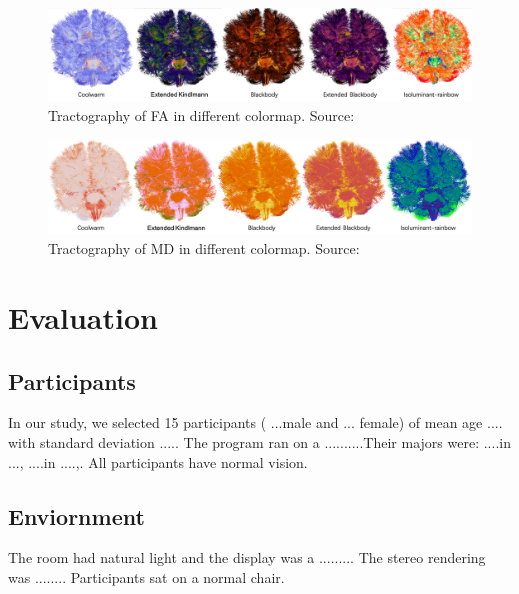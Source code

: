 \documentclass[a4paper, 12pt]{report}
\begin{document}
\begin{figure}[ht]
    \centering
    \includegraphics[width = 0.9\columnwidth]{7}
    \caption{Tractography of FA in different colormap. Source:  \cite{???}}
    \label{fig:7}
\end{figure}

\begin{figure}[ht]
    \centering
    \includegraphics[width = 0.9\columnwidth]{8}
    \caption{Tractography of MD in different colormap. Source:  \cite{???}}
    \label{fig:8}
\end{figure}

\chapter{Evaluation}

\section{Participants }
In our study, we selected 15 participants ( ...male and ... female) of mean age .... with standard deviation ..... 
The program ran on a ..........Their majors were: ....in ..., ....in ....,.  All participants have normal vision. 

\section{Enviornment}
The room had natural light and the display was a ......... The stereo rendering was ........
Participants sat on a normal chair.
\end{document}
